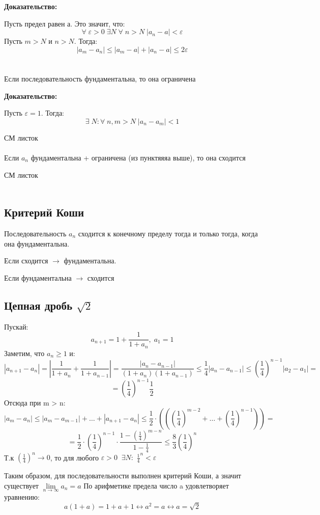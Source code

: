 \documentclass[a4paper,12pt]{article}
\begin{document}
\textbf{Доказательство:}

Пусть предел равен а. Это значит, что:
\[
\forall \; \varepsilon > 0 \; \exists N\; \forall\; n > N \;|a_n - a| < \varepsilon
\]
Пусть $m > N$ и $n > N$. Тогда:
\[
|a_m - a_n| \leq |a_m - a| + |a_n - a| \leq 2\varepsilon
\]
\\\\
Если последовательность фундаментальна, то она ограничена

\textbf{Доказательство:}

Пусть $\varepsilon = 1$. Тогда:
\[
\exists \; N : \forall \; n, m > N \;  |a_n - a_m| < 1
\]

СМ листок
\\\\
Если $a_n$ фундаментальна + ограничена (из пунктяяяа выше),  то она сходится

СМ листок
\\\\

\subsection*{Критерий Коши}
Последовательность $a_n$ сходится к конечному пределу тогда и только тогда, когда она фундаментальна.

Если сходится $\rightarrow$ фундаментальна.

Если фундаментальна $\rightarrow$ сходится

\subsection*{Цепная дробь $\sqrt{2}$}
Пускай:
\[
a_{n+1} = 1 + \frac{1}{1+a_n}, \; a_1 = 1
\]
Заметим, что $a_n \geq 1$ и:
\[
|a_{n+1} - a_n| = \left| \frac{1}{1+a_n} +  \frac{1}{1+a_{n-1}}  \right| = \frac{|a_n - a_{n-1}|}{(1+a_n)(1+a_{n-1})} \leq \frac{1}{4}|a_n-a_{n-1}| \leq \left(\frac{1}{4}\right)^{n-1}|a_2-a_1| =\]
\[
= \left(\frac{1}{4}\right)^{n-1}\frac{1}{2}
\]
Отсюда при m > n:
\[
|a_m - a_n| \leq |a_m - a_{m-1} |+ \ldots + |a_{n+1} - a_n |  \leq \frac{1}{2}
\cdot \left(\left( \left(\frac{1}{4}\right)^{m-2} + \ldots + \left(\frac{1}{4}\right)^{n-1}    \right)\right) = 
\]
\[
= \frac{1}{2} \cdot \left(\frac{1}{4}\right)^{n-1} \cdot 
\frac{1 - (\frac{1}{4})^{m-n}}{1-\frac{1}{4}} \leq
\frac{8}{3} (\frac{1}{4})^n
\]
Т.к $(\frac{1}{4})^n \rightarrow 0$, то для любого $\varepsilon > 0 \; \; \exists N:$ $\frac{1}{4}^n < \varepsilon$

Таким образом, для последовательности выполнен критерий Коши, а значит существует $\lim\limits_{n\rightarrow \infty} a_n = a$ По арифметике предела число a  удовлетворяет уравнению:
\[
a(1+a) = 1 + a + 1 \leftrightarrow a^2 = a \leftrightarrow a = \sqrt{2}
\]
\end{document}
